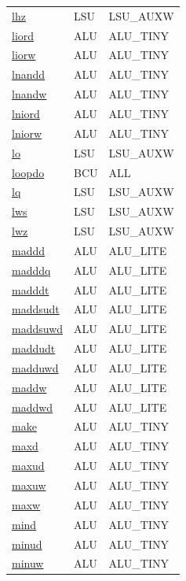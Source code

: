 \begin{small}
\begin{longtable}[l]{l l l}
\hyperlink{lvx.lhz}{lhz} & LSU & LSU\_AUXW \\ 
\hyperlink{lvx.liord}{liord} & ALU & ALU\_TINY \\ 
\hyperlink{lvx.liorw}{liorw} & ALU & ALU\_TINY \\ 
\hyperlink{lvx.lnandd}{lnandd} & ALU & ALU\_TINY \\ 
\hyperlink{lvx.lnandw}{lnandw} & ALU & ALU\_TINY \\ 
\hyperlink{lvx.lniord}{lniord} & ALU & ALU\_TINY \\ 
\hyperlink{lvx.lniorw}{lniorw} & ALU & ALU\_TINY \\ 
\hyperlink{lvx.lo}{lo} & LSU & LSU\_AUXW \\ 
\hyperlink{lvx.loopdo}{loopdo} & BCU & ALL \\ 
\hyperlink{lvx.lq}{lq} & LSU & LSU\_AUXW \\ 
\hyperlink{lvx.lws}{lws} & LSU & LSU\_AUXW \\ 
\hyperlink{lvx.lwz}{lwz} & LSU & LSU\_AUXW \\ 
\hyperlink{lvx.maddd}{maddd} & ALU & ALU\_LITE \\ 
\hyperlink{lvx.madddq}{madddq} & ALU & ALU\_LITE \\ 
\hyperlink{lvx.madddt}{madddt} & ALU & ALU\_LITE \\ 
\hyperlink{lvx.maddsudt}{maddsudt} & ALU & ALU\_LITE \\ 
\hyperlink{lvx.maddsuwd}{maddsuwd} & ALU & ALU\_LITE \\ 
\hyperlink{lvx.maddudt}{maddudt} & ALU & ALU\_LITE \\ 
\hyperlink{lvx.madduwd}{madduwd} & ALU & ALU\_LITE \\ 
\hyperlink{lvx.maddw}{maddw} & ALU & ALU\_LITE \\ 
\hyperlink{lvx.maddwd}{maddwd} & ALU & ALU\_LITE \\ 
\hyperlink{lvx.make}{make} & ALU & ALU\_TINY \\ 
\hyperlink{lvx.maxd}{maxd} & ALU & ALU\_TINY \\ 
\hyperlink{lvx.maxud}{maxud} & ALU & ALU\_TINY \\ 
\hyperlink{lvx.maxuw}{maxuw} & ALU & ALU\_TINY \\ 
\hyperlink{lvx.maxw}{maxw} & ALU & ALU\_TINY \\ 
\hyperlink{lvx.mind}{mind} & ALU & ALU\_TINY \\ 
\hyperlink{lvx.minud}{minud} & ALU & ALU\_TINY \\ 
\hyperlink{lvx.minuw}{minuw} & ALU & ALU\_TINY \\ 

\end{longtable}
\end{small}
